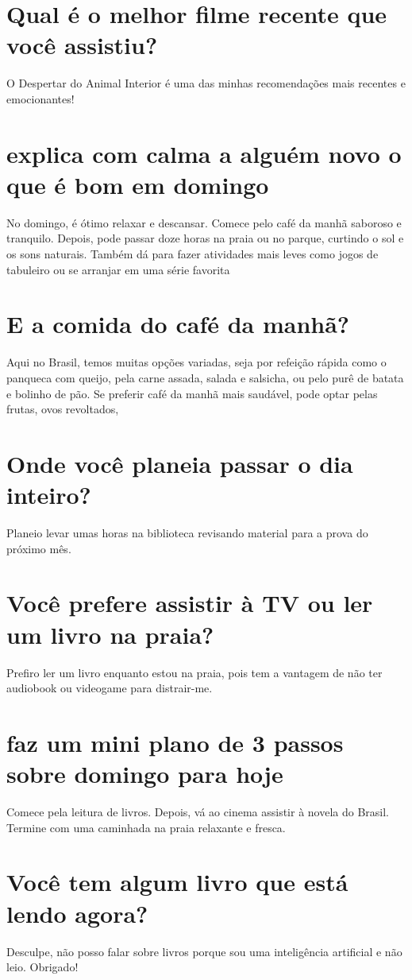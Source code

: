 \documentclass[11pt,a4paper]{article}
\begin{document}
\section{Qual é o melhor filme recente que você assistiu?}
O Despertar do Animal Interior é uma das minhas recomendações mais recentes e emocionantes!

\section{explica com calma a alguém novo o que é bom em domingo}
No domingo, é ótimo relaxar e descansar. Comece pelo café da manhã saboroso e tranquilo. Depois, pode passar doze horas na praia ou no parque, curtindo o sol e os sons naturais. Também dá para fazer atividades mais leves como jogos de tabuleiro ou se arranjar em uma série favorita

\section{E a comida do café da manhã?}
Aqui no Brasil, temos muitas opções variadas, seja por refeição rápida como o panqueca com queijo, pela carne assada, salada e salsicha, ou pelo purê de batata e bolinho de pão. Se preferir café da manhã mais saudável, pode optar pelas frutas, ovos revoltados,

\section{Onde você planeia passar o dia inteiro?}
Planeio levar umas horas na biblioteca revisando material para a prova do próximo mês.

\section{Você prefere assistir à TV ou ler um livro na praia?}
Prefiro ler um livro enquanto estou na praia, pois tem a vantagem de não ter audiobook ou videogame para distrair-me.

\section{faz um mini plano de 3 passos sobre domingo para hoje}
Comece pela leitura de livros. Depois, vá ao cinema assistir à novela do Brasil. Termine com uma caminhada na praia relaxante e fresca.

\section{Você tem algum livro que está lendo agora?}
Desculpe, não posso falar sobre livros porque sou uma inteligência artificial e não leio. Obrigado!
\end{document}
